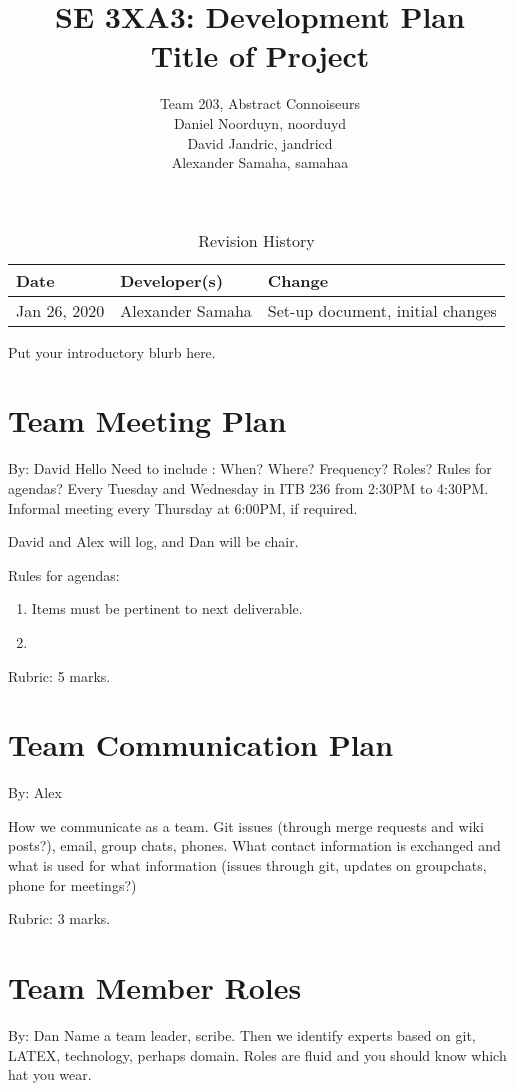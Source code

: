 \documentclass{article}
\title{SE 3XA3: Development Plan\\Title of Project}
\author{Team 203, Abstract Connoiseurs\\
Daniel Noorduyn, noorduyd\\
David Jandric, jandricd\\
Alexander Samaha, samahaa\\
}
\date{}
\begin{document}
\begin{table}[hp]
\caption{Revision History} \label{TblRevisionHistory}
\begin{tabularx}{\textwidth}{llX}
\toprule
\textbf{Date} & \textbf{Developer(s)} & \textbf{Change}\\
\midrule
Jan 26, 2020 & Alexander Samaha & Set-up document, initial changes\\
\bottomrule
\end{tabularx}
\end{table}

\newpage

\maketitle

Put your introductory blurb here.

\section{Team Meeting Plan}

By: David
Hello
Need to include :  When?  Where?  Frequency?  Roles?  Rules for agendas?
Every Tuesday and Wednesday in ITB 236 from 2:30PM to 4:30PM.
Informal meeting every Thursday at 6:00PM, if required.

David and Alex will log, and Dan will be chair.

Rules for agendas:
\begin{enumerate}
    \item Items must be pertinent to next deliverable.
    \item 
\end{enumerate}


Rubric:  5 marks.

\section{Team Communication Plan}
By: Alex

How we communicate as a team.  Git issues (through merge requests and wiki
posts?), email, group chats, phones.  What contact information is exchanged and
what is used for what information (issues through git,  updates on groupchats,
phone for meetings?)

Rubric:  3 marks.

\section{Team Member Roles}
By: Dan
Name  a  team  leader,  scribe.   Then  we  identify  experts  based  on  git,  
LATEX,
technology,  perhaps  domain.   Roles  are  fluid  and  you  should  know  
which  hat
you wear.
\end{document}
